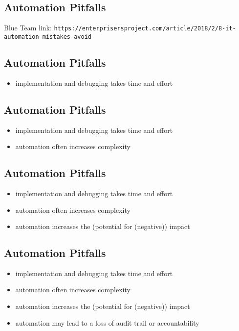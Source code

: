 \documentclass[xga]{xdvislides}
\begin{document}
\subsection{Automation Pitfalls}
\vspace{.5in}
Blue Team link:
\verb+https://enterprisersproject.com/article/2018/2/8-it-automation-mistakes-avoid+

\subsection{Automation Pitfalls}
\begin{itemize}
	\item implementation and debugging takes time and effort
\end{itemize}

\subsection{Automation Pitfalls}
\begin{itemize}
	\item implementation and debugging takes time and effort
	\item automation often increases complexity
\end{itemize}

\subsection{Automation Pitfalls}
\begin{itemize}
	\item implementation and debugging takes time and effort
	\item automation often increases complexity
	\item automation increases the (potential for (negative)) impact
\end{itemize}

\subsection{Automation Pitfalls}
\begin{itemize}
	\item implementation and debugging takes time and effort
	\item automation often increases complexity
	\item automation increases the (potential for (negative)) impact
	\item automation may lead to a loss of audit trail or accountability
\end{itemize}
\end{document}
